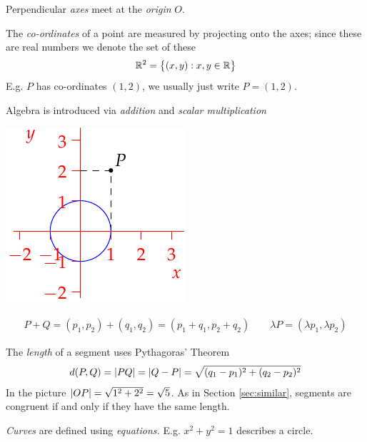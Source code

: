 \begin{itemize}\itemsep2pt
  \begin{minipage}[t]{0.72\linewidth}\vspace{-5pt}
  \item Perpendicular \emph{axes} meet at the \emph{origin} $O$.
  \item The \emph{co-ordinates} of a point are measured by projecting onto the axes; since these are real numbers we denote the set of these
  \[\mathbb{R}^2=\bigl\{(x,y):x,y\in\mathbb{R}\bigr\}\]
  E.g.{} $P$ has co-ordinates $(1,2)$, we usually just write $P=(1,2)$.
  \item Algebra is introduced via \emph{addition} and \emph{scalar multiplication}
\end{minipage}\hfill\begin{minipage}[t]{0.27\linewidth}\vspace{-5pt}
\flushright\includegraphics{analytic-axes}
\end{minipage}\par\vspace{-15pt}
  \begin{gather*}
  P+Q=(p_1,p_2)+(q_1,q_2)=(p_1+q_1,p_2+q_2)\qquad
  \lambda P=(\lambda p_1,\lambda p_2)
  \end{gather*}
  \item The \emph{length} of a segment uses Pythagoras' Theorem\footnotemark
  \[d(P,Q)=\left| PQ\right|=\left| Q-P\right|=\sqrt{(q_1-p_1)^2+(q_2-p_2)^2}\]
  In the picture $\left| OP\right|=\sqrt{1^2+2^2}=\sqrt 5$. As in Section \ref{sec:similar}, segments are congruent if and only if they have the same length.

  \item \emph{Curves} are defined using \emph{equations.} E.g.{} $x^2+y^2=1$ describes a circle. 
\end{itemize}


